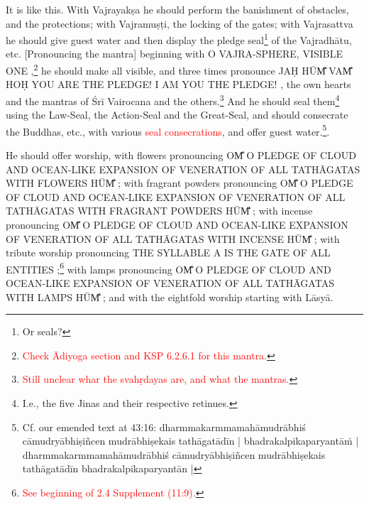 \documentclass[11pt]{book}
\makeatletter
\def\fakesc#1{%
  \begingroup%
  \xdef\fake@name{\csname\curr@fontshape/\f@size\endcsname}%
  \fontsize{1.3\fontdimen8\fake@name}{\baselineskip}\selectfont%
  \uppercase{#1}%
  \endgroup%
}
\newcommand{\mantra}[1]{\fakesc{#1}}
\newcommand{\red}[1]{\textcolor{red}{#1}}
\makeatother
\begin{document}
It is like this. With Vajrayakṣa he should perform the banishment of obstacles, and the protections; with Vajramuṣṭi, the locking of the gates; with Vajrasattva he should give guest water and then display the pledge seal\footnote{Or seals?} of the Vajradhātu, etc. [Pronouncing the mantra] beginning with  \mantra{O Vajra-sphere, visible one},\footnote{\red{Check Ādiyoga section and KSP 6.2.6.1 for this mantra.}} he should make all visible, and three times pronounce \mantra{jaḥ hūm̐ vam̐ hoḥ you are the pledge! I am you the pledge!}, the own hearts and the mantras of Śrī Vairocana and the others.\footnote{\red{Still unclear whar the svahṛdayas are, and what the mantras.}} And he should seal them\footnote{I.e., the five Jinas and their respective retinues.} using the Law-Seal, the Action-Seal and the Great-Seal, and should consecrate the Buddhas, etc., with various \red{seal consecrations}, and offer guest water.\footnote{Cf. our emended text at 43:16: dharmmakarmmamahāmudrābhiś cāmudryābhiṣiñcen mudrābhiṣekais tathāgatādīn | bhadrakalpikaparyantāṁ | dharmmakarmmamahāmudrābhiś cāmudryābhiṣiñcen mudrābhiṣekais tathāgatādīn bhadrakalpikaparyantān |}.\par
	He should offer worship, with flowers pronouncing \mantra{om̐ o pledge of cloud and ocean-like expansion of veneration of All Tathāgatas with flowers hūm̐};
	with fragrant powders pronouncing \mantra{om̐ o pledge of cloud and ocean-like expansion of veneration of All Tathāgatas with fragrant powders hūm̐};
	with incense pronouncing \mantra{om̐ o pledge of cloud and ocean-like expansion of veneration of All Tathāgatas with incense hūm̐};
	with tribute worship pronouncing \mantra{the syllable a is the gate of all entities};\footnote{\red{See beginning of 2.4 Supplement (11:9).}}
	with lamps pronouncing \mantra{om̐ o pledge of cloud and ocean-like expansion of veneration of All Tathāgatas with lamps hūm̐};
	and with the eightfold worship starting with Lāsyā.
	
\end{document}
